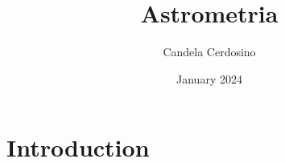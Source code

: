 \documentclass{article}
\title{Astrometria}
\author{Candela Cerdosino}
\date{January 2024}
\begin{document}
\maketitle

\section{Introduction}
\end{document}
